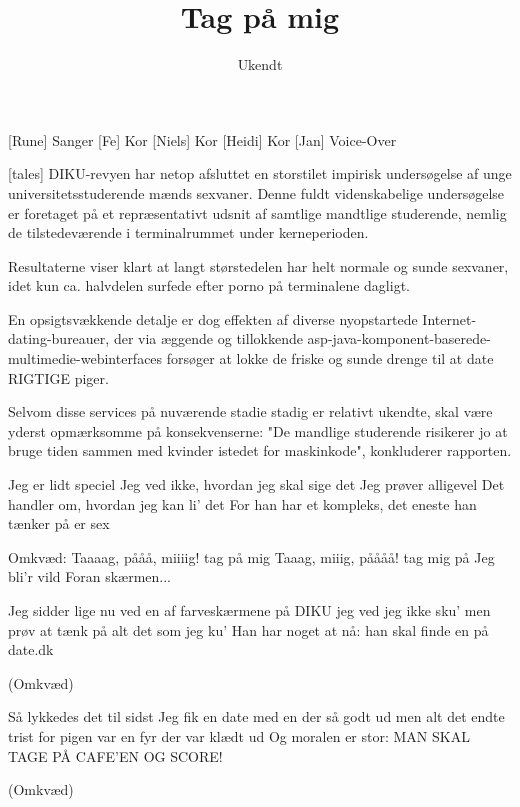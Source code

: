 \documentclass[a4paper,12pt]{article}
\title{Tag på mig}
\author{Ukendt}
\begin{document}
\maketitle

\begin{roles}
  [Rune] Sanger
  [Fe] Kor
  [Niels] Kor
  [Heidi] Kor
  [Jan] Voice-Over
\end{roles}

\begin{song}
  
  [tales] DIKU-revyen har netop afsluttet en storstilet impirisk
  undersøgelse af unge universitetsstuderende mænds sexvaner. Denne
  fuldt videnskabelige undersøgelse er foretaget på et repræsentativt
  udsnit af samtlige mandtlige studerende, nemlig de tilstedeværende i
  terminalrummet under kerneperioden.
  
   Resultaterne viser klart at langt størstedelen har helt
  normale og sunde sexvaner, idet kun ca. halvdelen surfede efter
  porno på terminalene dagligt.
  
   En opsigtsvækkende detalje er dog effekten af diverse
  nyopstartede Internet-dating-bureauer, der via æggende og
  tillokkende asp-java-komponent-baserede-multimedie-webinterfaces
  forsøger at lokke de friske og sunde drenge til at date RIGTIGE
  piger.
  
   Selvom disse services på nuværende stadie stadig er
  relativt ukendte, skal være yderst opmærksomme på konsekvenserne:
  "De mandlige studerende risikerer jo at bruge tiden sammen med
  kvinder istedet for maskinkode", konkluderer rapporten.

   Jeg er lidt speciel
  Jeg ved ikke, hvordan jeg skal sige det
  Jeg prøver alligevel
  Det handler om, hvordan jeg kan li' det
   For han har et kompleks,
  det eneste han tænker på er sex

  Omkvæd:
   Taaaag, pååå, miiiig!
   tag på mig
   Taaag, miiig, påååå!
   tag mig på
   Jeg bli'r vild
  Foran skærmen...

   Jeg sidder lige nu
  ved en af farveskærmene på DIKU
  jeg ved jeg ikke sku'
  men prøv at tænk på alt det som jeg ku'
   Han har noget at nå:
  han skal finde en på date.dk

  (Omkvæd)
  
   Så lykkedes det til sidst
  Jeg fik en date med en der så godt ud
  men alt det endte trist
  for pigen var en fyr der var klædt ud
   Og moralen er stor:
  MAN SKAL TAGE PÅ CAFE'EN OG SCORE!

  (Omkvæd)


\end{song}
\end{document}
